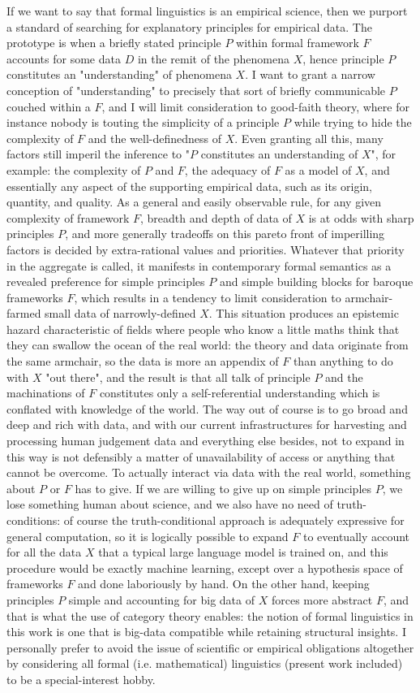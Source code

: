 If we want to say that formal linguistics is an empirical science, then we purport a standard of searching for explanatory principles for empirical data. The prototype is when a briefly stated principle $P$ within formal framework $F$ accounts for some data $D$ in the remit of the phenomena $X$, hence principle $P$ constitutes an "understanding" of phenomena $X$. I want to grant a narrow conception of "understanding" to precisely that sort of briefly communicable $P$ couched within a $F$, and I will limit consideration to good-faith theory, where for instance nobody is touting the simplicity of a principle $P$ while trying to hide the complexity of $F$ and the well-definedness of $X$. Even granting all this, many factors still imperil the inference to "$P$ constitutes an understanding of $X$", for example: the complexity of $P$ and $F$, the adequacy of $F$ as a model of $X$, and essentially any aspect of the supporting empirical data, such as its origin, quantity, and quality. As a general and easily observable rule, for any given complexity of framework $F$, breadth and depth of data of $X$ is at odds with sharp principles $P$, and more generally tradeoffs on this pareto front of imperilling factors is decided by extra-rational values and priorities. Whatever that priority in the aggregate is called, it manifests in contemporary formal semantics as a revealed preference for simple principles $P$ and simple building blocks for baroque frameworks $F$, which results in a tendency to limit consideration to armchair-farmed small data of narrowly-defined $X$. This situation produces an epistemic hazard characteristic of fields where people who know a little maths think that they can swallow the ocean of the real world: the theory and data originate from the same armchair, so the data is more an appendix of $F$ than anything to do with $X$ "out there", and the result is that all talk of principle $P$ and the machinations of $F$ constitutes only a self-referential understanding which is conflated with knowledge of the world. The way out of course is to go broad and deep and rich with data, and with our current infrastructures for harvesting and processing human judgement data and everything else besides, not to expand in this way is not defensibly a matter of unavailability of access or anything that cannot be overcome. To actually interact via data with the real world, something about $P$ or $F$ has to give. If we are willing to give up on simple principles $P$, we lose something human about science, and we also have no need of truth-conditions: of course the truth-conditional approach is adequately expressive for general computation, so it is logically possible to expand $F$ to eventually account for all the data $X$ that a typical large language model is trained on, and this procedure would be exactly machine learning, except over a hypothesis space of frameworks $F$ and done laboriously by hand. On the other hand, keeping principles $P$ simple and accounting for big data of $X$ forces more abstract $F$, and that is what the use of category theory enables: the notion of formal linguistics in this work is one that is big-data compatible while retaining structural insights. I personally prefer to avoid the issue of scientific or empirical obligations altogether by considering all formal (i.e. mathematical) linguistics (present work included) to be a special-interest hobby.